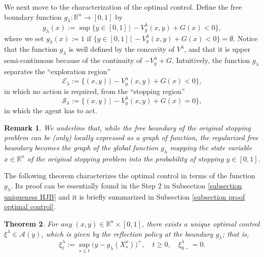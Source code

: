 \documentclass[11pt]{amsart}
\newtheorem{theorem}{Theorem}[section]
\newtheorem{remark}[theorem]{Remark}
\theoremstyle{plain}
\def \R{\mathbb{R}}
\numberwithin{equation}{section}
\begin{document}
We next move to the characterization of the optimal control.
Define the free boundary function $g_\lambda : \R^n \to [0,1]$ by
\begin{equation}\label{eq def free boundary}
    g_\lambda (x) := \sup \big\{ y \in[0,1]  \, | \, - V^\lambda_y (x,y) +  G(x) < 0 \big\},
\end{equation}
where we set $g_\lambda (x):=1$ if $\{ y \in[0,1] \, | \, - V^\lambda_y (x,y) +  G(x) < 0 \} = \emptyset$.
Notice that the function $g_\lambda$ is well defined by the concavity of $V^\lambda$, and that it is upper semi-continuous because of the continuity of $-V_y^\lambda + G$. 
{Intuitively, the function $g_\lambda$ separates the ``exploration region'' 
\begin{equation}
    \label{eq exploration region}
    \mathcal E_\lambda := \{ (x,y) \, | \, - V^\lambda_y (x,y) +  G(x) < 0 \},
\end{equation}
 in which no action is  required, from the ``stopping region'' 
 \begin{equation}
    \label{eq stopping region}
\mathcal S _\lambda := \{ (x,y) \, | \, - V^\lambda_y (x,y) +  G(x) = 0 \},
\end{equation}
in which the agent has to act.}

\begin{remark}
    We underline that, while the free boundary of the original stopping problem can be (only) locally expressed as a graph of function, the regularized free boundary becomes the graph of the  global function $g_\lambda$ mapping the state variable $x \in \R^n$ of the original stopping  problem into the probability of stopping $y \in [0,1]$.
\end{remark}

The following theorem characterizes the optimal control in terms of the function $g_\lambda$.
Its proof can be essentially found in the Step 2 in Subsection \ref{subsection uniqueness HJB} and it  is briefly summarized in Subsection \ref{subsection proof optimal control}.

\begin{theorem}\label{theorem optimal control}
For any $(x,y) \in \R ^n \times [0,1]$, there exists a unique optimal control $\xi^\lambda \in \mathcal A (y)$, which is given by the reflection policy at the boundary $g_\lambda$; that is,
$$
\xi^\lambda_t := \sup_{s\leq t } \big( y- g_\lambda (X^x_s) \big)^+, \quad t\geq 0, \quad \xi^\lambda_{0-} = 0.
$$
\end{theorem}
\end{document}
